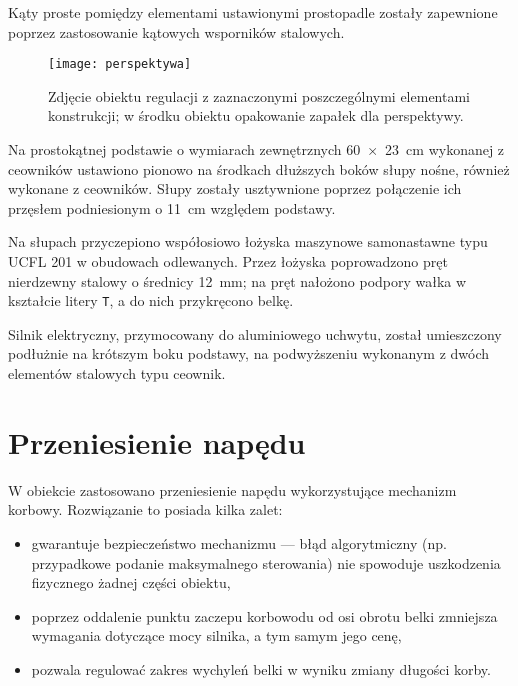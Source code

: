 Kąty proste pomiędzy elementami ustawionymi prostopadle zostały zapewnione poprzez zastosowanie kątowych wsporników stalowych.

\begin{figure}[H]
	\centering
	\texttt{[image: perspektywa]}
	\caption{Zdjęcie obiektu regulacji z zaznaczonymi poszczególnymi elementami konstrukcji; w środku obiektu opakowanie zapałek dla perspektywy.}
	\label{fig:perspektywa}
\end{figure}

Na prostokątnej podstawie o wymiarach zewnętrznych \SI{60 x 23}{cm} wykonanej z ceowników ustawiono pionowo na środkach dłuższych boków słupy nośne, również wykonane z ceowników. Słupy zostały usztywnione poprzez połączenie ich przęsłem podniesionym o \SI{11}{cm} względem podstawy.

Na słupach przyczepiono współosiowo łożyska maszynowe samonastawne typu UCFL 201 w obudowach odlewanych. Przez łożyska poprowadzono pręt nierdzewny stalowy o średnicy \SI{12}{mm}; na pręt nałożono podpory wałka w kształcie litery \texttt{T}, a do nich przykręcono belkę.

Silnik elektryczny, przymocowany do aluminiowego uchwytu, został umieszczony podłużnie na krótszym boku podstawy, na podwyższeniu wykonanym z dwóch elementów stalowych typu ceownik.


\section{Przeniesienie napędu}
\label{sec:ch2_przeniesienie_napedu}

W obiekcie zastosowano przeniesienie napędu wykorzystujące mechanizm korbowy. Rozwiązanie to posiada kilka zalet:

\begin{itemize}
	\item gwarantuje bezpieczeństwo mechanizmu --- błąd algorytmiczny (np. przypadkowe podanie maksymalnego sterowania) nie spowoduje uszkodzenia fizycznego żadnej części obiektu,
	\item poprzez oddalenie punktu zaczepu korbowodu od osi obrotu belki zmniejsza wymagania dotyczące mocy silnika, a tym samym jego cenę,
	\item pozwala regulować zakres wychyleń belki w wyniku zmiany długości korby.
\end{itemize}


